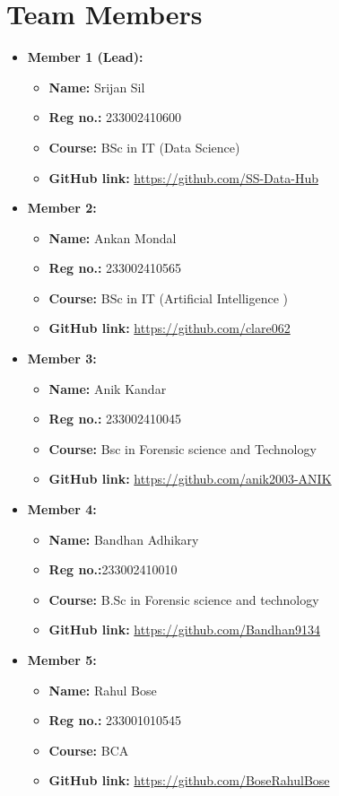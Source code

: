 \documentclass[a4paper,12pt]{article}
\begin{document}
\section*{Team Members}
\begin{itemize}
    \item \textbf{Member 1 (Lead):}
    \begin{itemize}
        \item \textbf{Name:} Srijan Sil
        \item \textbf{Reg no.:} 233002410600
        \item \textbf{Course:} BSc in IT (Data Science)
        \item \textbf{GitHub link:} \url{https://github.com/SS-Data-Hub}
    \end{itemize}
    \item \textbf{Member 2:} 
    \begin{itemize}
        \item \textbf{Name:} Ankan Mondal
        \item \textbf{Reg no.:} 233002410565
        \item \textbf{Course:} BSc in IT (Artificial Intelligence )
        \item \textbf{GitHub link:} \url{https://github.com/clare062}
    \end{itemize}
    \item \textbf{Member 3:}
    \begin{itemize}
        \item \textbf{Name:} Anik Kandar
        \item \textbf{Reg no.:} 233002410045
        \item \textbf{Course:} Bsc in Forensic science and Technology 
        \item \textbf{GitHub link:} \url{https://github.com/anik2003-ANIK}
    \end{itemize}
    \item \textbf{Member 4:}
    \begin{itemize}
        \item \textbf{Name:} Bandhan Adhikary 
        \item \textbf{Reg no.:}233002410010 
        \item \textbf{Course:} B.Sc in Forensic science and technology 
        \item \textbf{GitHub link:} \url{https://github.com/Bandhan9134}
    \end{itemize}
    \item \textbf{Member 5:}
    \begin{itemize}
        \item \textbf{Name:} Rahul Bose
        \item \textbf{Reg no.:} 233001010545
        \item \textbf{Course:} BCA
        \item \textbf{GitHub link:} \url{https://github.com/BoseRahulBose}
    \end{itemize}
\end{itemize}
\end{document}
